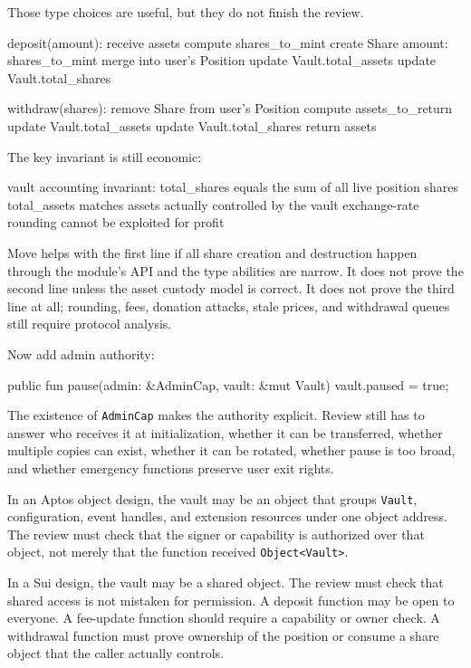 Those type choices are useful, but they do not finish the review.

\begin{codeblock}
deposit(amount):
    receive assets
    compute shares_to_mint
    create Share { amount: shares_to_mint }
    merge into user's Position
    update Vault.total_assets
    update Vault.total_shares

withdraw(shares):
    remove Share from user's Position
    compute assets_to_return
    update Vault.total_assets
    update Vault.total_shares
    return assets
\end{codeblock}

The key invariant is still economic:

\begin{codeblock}
vault accounting invariant:
    total_shares equals the sum of all live position shares
    total_assets matches assets actually controlled by the vault
    exchange-rate rounding cannot be exploited for profit
\end{codeblock}

Move helps with the first line if all share creation and destruction happen through the module's API and the type abilities are narrow. It does not prove the second line unless the asset custody model is correct. It does not prove the third line at all; rounding, fees, donation attacks, stale prices, and withdrawal queues still require protocol analysis.

Now add admin authority:

\begin{codeblock}
public fun pause(admin: &AdminCap, vault: &mut Vault) {
    vault.paused = true;
}
\end{codeblock}

The existence of \texttt{AdminCap} makes the authority explicit. Review still has to answer who receives it at initialization, whether it can be transferred, whether multiple copies can exist, whether it can be rotated, whether pause is too broad, and whether emergency functions preserve user exit rights.

In an Aptos object design, the vault may be an object that groups \texttt{Vault}, configuration, event handles, and extension resources under one object address. The review must check that the signer or capability is authorized over that object, not merely that the function received \texttt{Object<Vault>}.

In a Sui design, the vault may be a shared object. The review must check that shared access is not mistaken for permission. A deposit function may be open to everyone. A fee-update function should require a capability or owner check. A withdrawal function must prove ownership of the position or consume a share object that the caller actually controls.

